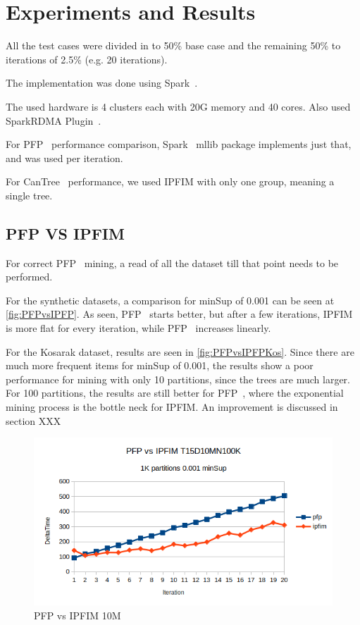 \section{Experiments and Results}


All the test cases were divided in to 50\% base case and the remaining 50\% to iterations of 2.5\% (e.g. 20 iterations).

The implementation was done using Spark~\cite{spark}.

The used hardware is 4 clusters each with 20G memory and 40 cores. Also used SparkRDMA Plugin~\cite{SparkRDMA}.

For PFP~\cite{li2008pfp} performance comparison, Spark~\cite{spark} mllib package implements just that, and was used per iteration.

For CanTree~\cite{leung2005cantree} performance, we used IPFIM with only one group, meaning a single tree.

\subsection{PFP VS IPFIM}
 For correct PFP~\cite{li2008pfp} mining, a read of all the dataset till that point needs to be performed.

For the synthetic datasets, a comparison for minSup of 0.001 can be seen at \autoref{fig:PFPvsIPFP}. As seen, PFP~\cite{li2008pfp} starts better, but after a few iterations, IPFIM is more flat for every iteration, while PFP~\cite{li2008pfp} increases linearly.

For the Kosarak dataset, results are seen in \autoref{fig:PFPvsIPFPKos}.
Since there are much more frequent items for minSup of 0.001, the results show a poor performance for mining with only 10 partitions, since the trees are much larger. For 100 partitions, the results are still better for PFP~\cite{li2008pfp}, where the exponential mining process is the bottle neck for IPFIM. An improvement is discussed in section XXX

\begin{figure}
  \centering
  \includegraphics[width=\linewidth]{figures/PFPvsIPFIM0_001_10M}
  \caption{PFP vs IPFIM 10M}
  \label{fig:PFPvsIPFP}
\end{figure}

